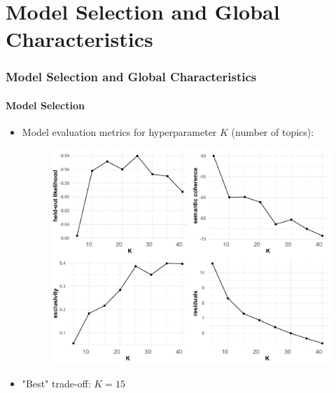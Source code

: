 \documentclass[xcolor=dvipsnames]{beamer}
\begin{document}
\section{Model Selection and Global Characteristics}
\begin{frame}
\frametitle{Model Selection and Global Characteristics}
\framesubtitle{Model Selection}
\begin{itemize}
\item Model evaluation metrics for hyperparameter $K$ (number of topics):
	\begin{figure}[h!]
  	\centering
  	\includegraphics[scale = 0.30]{../plots/4_1/searchK.pdf}
	\end{figure}
\item "Best" trade-off: $K=15$
\end{itemize}
\end{frame}
\end{document}
